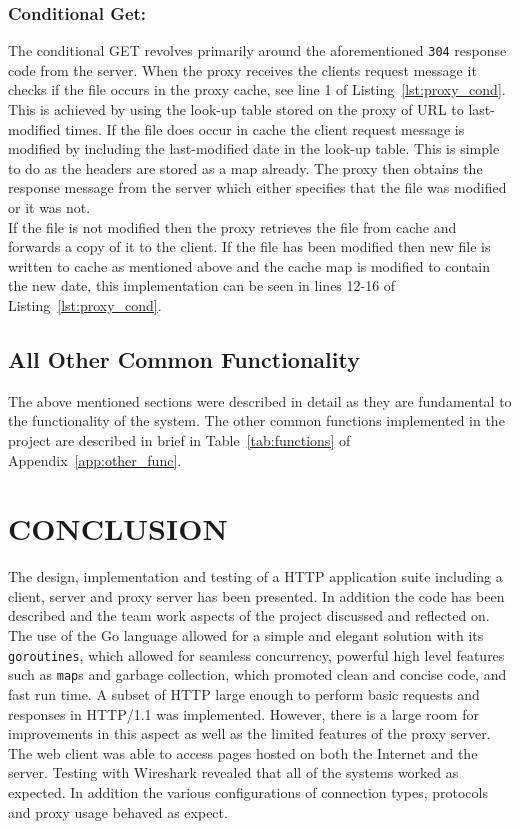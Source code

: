 \documentclass[10pt,twocolumn]{witseiepaper}
\begin{document}
		\subsubsection*{Conditional Get:} The conditional GET revolves primarily around the aforementioned \texttt{304} response code from the server. When the proxy receives the clients request message it checks if the file occurs in the proxy cache, see line 1 of Listing~\ref{lst:proxy_cond}. This is achieved by using the look-up table stored on the proxy of URL to last-modified times. If the file does occur in cache the client request message is modified by including the last-modified date in the look-up table. This is simple to do as the headers are stored as a map already. The proxy then obtains the response message from the server which either specifies that the file was modified or it was not. \\
		
		If the file is not modified then the proxy retrieves the file from cache and forwards a copy of it to the client. If the file has been modified then new file is written to cache as mentioned above and the cache map is modified to contain the new date, this implementation can be seen in lines 12-16 of Listing~\ref{lst:proxy_cond}. 
	
	\subsection{All Other Common Functionality}
	
		The above mentioned sections were described in detail as they are fundamental to the functionality of the system. The other common functions implemented in the project are described in brief in Table~\ref{tab:functions} of Appendix~\ref{app:other_func}.


\section{CONCLUSION}

The design, implementation and testing of a HTTP application suite including a client, server and proxy server has been presented. In addition the code has been described and the team work aspects of the project discussed and reflected on. The use of the Go language allowed for a simple and elegant solution with its \texttt{goroutines}, which allowed for seamless concurrency, powerful high level features such as \texttt{map}s and garbage collection, which promoted clean and concise code, and fast run time. A subset of HTTP large enough to perform basic requests and responses in HTTP/1.1 was implemented. However, there is a large room for improvements in this aspect as well as the limited features of the proxy server. The web client was able to access pages hosted on both the Internet and the server. Testing with Wireshark revealed that all of the systems worked as expected. In addition the various configurations of connection types, protocols and proxy usage behaved as expect.
\end{document}

